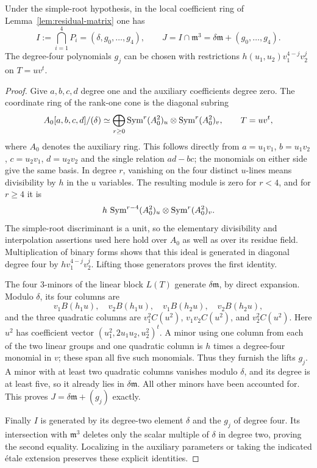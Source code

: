 \begin{lemma}\label{lem:cone-ideal}
Under the simple-root hypothesis, in the local coefficient ring of
Lemma~\ref{lem:residual-matrix} one has
\begin{equation}\label{eq:cone-ideal}
 I:=\bigcap_{i=1}^4P_i=(\delta,g_0,\ldots,g_4),\qquad
 J=I\cap\mathfrak m^3=\delta\mathfrak m+(g_0,\ldots,g_4).
\end{equation}
The degree-four polynomials $g_j$ can be chosen with restrictions
$h(u_1,u_2)v_1^{4-j}v_2^j$ on $T=u v^t$.
\end{lemma}
\begin{proof}
Give $a,b,c,d$ degree one and the auxiliary coefficients degree zero.
The coordinate ring of the rank-one cone is the diagonal subring
\begin{equation}\label{eq:segre-ring}
 A_0[a,b,c,d]/(\delta)
  \simeq\bigoplus_{r\ge0}
        \operatorname{Sym}^r(A_0^2)_u\otimes\operatorname{Sym}^r(A_0^2)_v,
 \qquad T=u v^t,
\end{equation}
where $A_0$ denotes the auxiliary ring. This follows directly from
$a=u_1v_1$, $b=u_1v_2$, $c=u_2v_1$, $d=u_2v_2$ and the single
relation $ad-bc$; the monomials on either side give the same basis.
In degree $r$, vanishing on the four distinct $u$-lines means divisibility
by $h$ in the $u$ variables. The resulting module is zero for $r<4$,
and for $r\ge4$ it is
\[
 h\,\operatorname{Sym}^{r-4}(A_0^2)_u\otimes\operatorname{Sym}^r(A_0^2)_v.
\]
The simple-root discriminant is a unit, so the elementary divisibility
and interpolation assertions used here hold over $A_0$ as well as
over its residue field. Multiplication of binary forms shows that this
ideal is generated in diagonal degree four by
$h v_1^{4-j}v_2^j$. Lifting those generators proves the first identity.

The four $3$-minors of the linear block $L(T)$ generate
$\delta\mathfrak m$, by direct expansion. Modulo $\delta$, its four
columns are
\[
 v_1B(h_1u),\quad v_2B(h_1u),\quad
 v_1B(h_2u),\quad v_2B(h_2u),
\]
and the three quadratic columns are
$v_1^2C(u^2)$, $v_1v_2C(u^2)$, and $v_2^2C(u^2)$.
Here $u^2$ has coefficient vector $(u_1^2,2u_1u_2,u_2^2)^t$.
A minor using one column from each of the two linear groups and one
quadratic column is $h$ times a degree-four monomial in $v$; these
span all five such monomials. Thus they furnish the lifts $g_j$.
A minor with at least two quadratic columns vanishes modulo $\delta$,
and its degree is at least five, so it already lies in
$\delta\mathfrak m$. All other minors have been accounted for.
This proves $J=\delta\mathfrak m+(g_j)$ exactly.

Finally $I$ is generated by its degree-two element $\delta$ and the
$g_j$ of degree four. Its intersection with $\mathfrak m^3$ deletes
only the scalar multiple of $\delta$ in degree two, proving the
second equality. Localizing in the auxiliary parameters or taking the
indicated \'etale extension preserves these explicit identities.
\end{proof}

